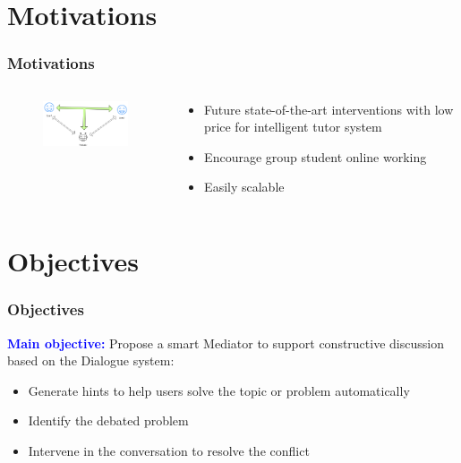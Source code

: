 \documentclass{beamer}
\begin{document}
\section{Motivations} %
\begin{frame}
\frametitle{Motivations}
\begin{columns}
	\begin{column}{.55\textwidth}
		\begin{figure}
			\includegraphics[width=55mm]{m1.png}
		\end{figure}

	\end{column}
	
	\begin{column}{.55\textwidth}
		\begin{itemize}
			\item Future state-of-the-art interventions with low price for intelligent tutor system
			\item Encourage group student online working
			\item Easily scalable 
		
			
		\end{itemize}
	\end{column}
\end{columns}
\end{frame}


\section{Objectives} %
\begin{frame}
\frametitle{Objectives}
{\large \textcolor{blue}{\textbf{Main objective:}}} Propose a smart Mediator to support constructive discussion based on the Dialogue system:

\begin{itemize}
	\item Generate hints to help users solve the topic or problem automatically
	\item    Identify the debated problem
	\item Intervene in the conversation to resolve the conflict
\end{itemize}

\end{frame}
\end{document}

